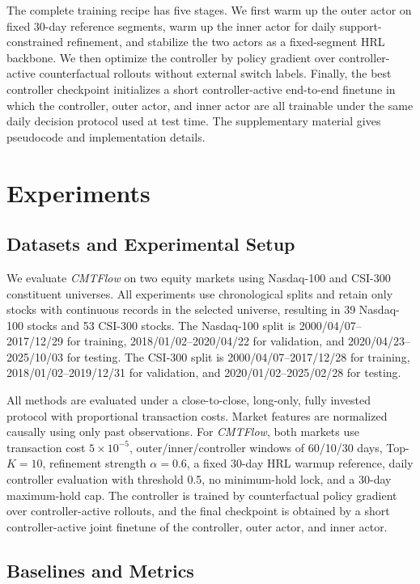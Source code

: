 \documentclass[letterpaper]{article} %
\begin{document}
The complete training recipe has five stages. We first warm up the outer actor on fixed 30-day reference segments, warm up the inner actor for daily support-constrained refinement, and stabilize the two actors as a fixed-segment HRL backbone. We then optimize the controller by policy gradient over controller-active counterfactual rollouts without external switch labels. Finally, the best controller checkpoint initializes a short controller-active end-to-end finetune in which the controller, outer actor, and inner actor are all trainable under the same daily decision protocol used at test time. The supplementary material gives pseudocode and implementation details.

\section{Experiments}
\subsection{Datasets and Experimental Setup}

We evaluate \textit{CMTFlow} on two equity markets using Nasdaq-100 and CSI-300 constituent universes. All experiments use chronological splits and retain only stocks with continuous records in the selected universe, resulting in 39 Nasdaq-100 stocks and 53 CSI-300 stocks. The Nasdaq-100 split is 2000/04/07--2017/12/29 for training, 2018/01/02--2020/04/22 for validation, and 2020/04/23--2025/10/03 for testing. The CSI-300 split is 2000/04/07--2017/12/28 for training, 2018/01/02--2019/12/31 for validation, and 2020/01/02--2025/02/28 for testing.

All methods are evaluated under a close-to-close, long-only, fully invested protocol with proportional transaction costs. Market features are normalized causally using only past observations. For \textit{CMTFlow}, both markets use transaction cost \(5\times10^{-5}\), outer/inner/controller windows of 60/10/30 days, Top-\(K=10\), refinement strength \(\alpha=0.6\), a fixed 30-day HRL warmup reference, daily controller evaluation with threshold 0.5, no minimum-hold lock, and a 30-day maximum-hold cap. The controller is trained by counterfactual policy gradient over controller-active rollouts, and the final checkpoint is obtained by a short controller-active joint finetune of the controller, outer actor, and inner actor.

\subsection{Baselines and Metrics}
\end{document}
